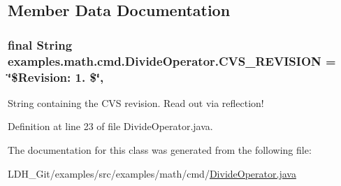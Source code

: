 \subsection{Member Data Documentation}
\hypertarget{classexamples_1_1math_1_1cmd_1_1_divide_operator_a5f19f3626572e7400d2638319961574b}{
\subsubsection[{C\-V\-S\-\_\-\-R\-E\-V\-I\-S\-I\-O\-N}]{\setlength{\rightskip}{0pt plus 5cm}final String examples.\-math.\-cmd.\-Divide\-Operator.\-C\-V\-S\-\_\-\-R\-E\-V\-I\-S\-I\-O\-N = \char`\"{}\$Revision\-: 1. \$\char`\"{}\hspace{0.3cm}{\ttfamily [static]}, {\ttfamily [private]}}}\label{classexamples_1_1math_1_1cmd_1_1_divide_operator_a5f19f3626572e7400d2638319961574b}
String containing the C\-V\-S revision. Read out via reflection! 

Definition at line 23 of file Divide\-Operator.\-java.



The documentation for this class was generated from the following file\-:\begin{DoxyCompactItemize}
\item 
L\-D\-H\-\_\-\-Git/examples/src/examples/math/cmd/\hyperlink{_divide_operator_8java}{Divide\-Operator.\-java}\end{DoxyCompactItemize}
